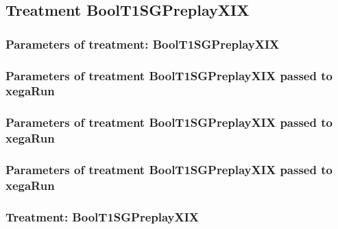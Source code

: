 \documentclass[18pt,c]{beamer}
\begin{document}
\clearpage
\subsection{Treatment BoolT1SGPreplayXIX}

 \begin{frame}
 \fontsize{8pt}{9pt}\selectfont
 \frametitle{  Parameters of treatment: BoolT1SGPreplayXIX 
 }

 \label{ExpCtParmTable004.tex}  
 \end{frame}


 \begin{frame}
 \fontsize{8pt}{9pt}\selectfont
 \frametitle{  Parameters of treatment BoolT1SGPreplayXIX passed to xegaRun
 }

 \label{ExpCtParmTable005.tex}  
 \end{frame}


 \begin{frame}
 \fontsize{8pt}{9pt}\selectfont
 \frametitle{  Parameters of treatment BoolT1SGPreplayXIX passed to xegaRun
 }

 \label{ExpCtParmTable006.tex}  
 \end{frame}


 \begin{frame}
 \fontsize{8pt}{9pt}\selectfont
 \frametitle{  Parameters of treatment BoolT1SGPreplayXIX passed to xegaRun
 }

 \label{ExpCtParmTable007.tex}  
 \end{frame}

 \begin{frame}
 \fontsize{8pt}{9pt}\selectfont
 \frametitle{ Treatment: BoolT1SGPreplayXIX }

 \label{ExpCStatsTable008.tex}  
 \end{frame}
\end{document}
